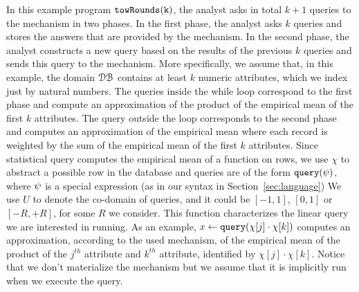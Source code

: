\begin{example}[twoRounds]
    In this example program $\mathtt{towRounds(k)}$, the analyst asks in total $k+1$ queries to the mechanism in two phases.
    In the first phase, the analyst asks $k$ queries and stores the answers that are provided by the mechanism. 
    In the second phase, the analyst constructs a new query based on the results of the previous $k$ queries and sends this query to the mechanism. More specifically, we assume that, in this example, the domain $\mathcal{DB}$ 
    contains at least $k$ numeric attributes, which we index just by natural numbers. 
    The queries inside the while loop correspond to the first phase and compute an approximation of 
    the product of the empirical mean of the first $k$ attributes. 
    The query outside the loop corresponds to the second phase and computes an approximation of the empirical mean where each record is weighted by the sum of the empirical mean of the first $k$ attributes.
    {Since statistical query computes the empirical mean of a function on rows, we use $\chi$ to abstract a possible row in the database and }
    queries are of the form ${\tt query}(\psi)$, where $\psi$ is a special expression 
    (as in our syntax in Section~\ref{sec:language})
    {
      We use $U$ to denote the co-domain of queries, and it could be $[-1,1]$, $[0,1]$ or $[-R,+R]$, for some $R$ we consider.
      This function characterizes the linear query we are interested in running. 
      As an example, $x \leftarrow {\tt query}(\chi[j] \cdot \chi[k])$ computes an approximation, according to the used mechanism, of the empirical mean of the product of the $j^{th}$ attribute and $k^{th}$ attribute, identified by $\chi[j] \cdot \chi[k]$. Notice that we don't materialize the mechanism but we assume that it is implicitly run when we execute the query. } 


\end{example}
